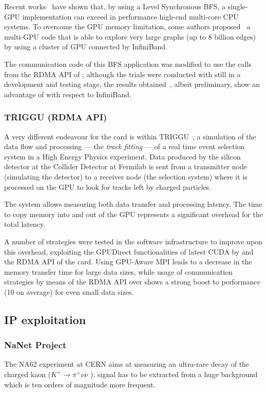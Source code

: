 Recent works~\cite{Hong:2011:BFS} have shown that, by using a Level
Synchronous BFS, a single-GPU implementation can exceed in performance
high-end multi-core CPU systems.
To overcome the GPU memory limitation, some authors
proposed~\cite{Graph400:2012:BFS} a multi-GPU code that is able to
explore very large graphs (up to 8 billion edges) by using a cluster
of GPU connected by InfiniBand.

The communication code of this BFS application was modified to use the
\PtoP calls from the RDMA API of \apenetp; although the trials were
conducted with \apenetp still in a development and testing stage, the
results obtained~\cite{Graph400:2012:IA3,CASS2013}, albeit
preliminary, show an advantage of \apenetp with respect to InfiniBand.

\subsubsection{TRIGGU (RDMA API)}
A very different endeavour for the \apenetp card is within
TRIGGU~\cite{TRIGGU:2012:NSS}, a simulation of the data flow and
processing --- the \emph{track fitting} --- of a real time event
selection system in a High Energy Physics experiment.
Data produced by the silicon detector at the Collider Detector at
Fermilab is sent from a transmitter node (simulating the detector) to
a receiver node (the selection system) where it is processed on the
GPU to look for tracks left by charged particles.

The system allows measuring both data transfer and processing latency.
The time to copy memory into and out of the GPU represents a
significant overhead for the total latency.

A number of strategies were tested in the software infrastructure to
improve upon this overhead, exploiting the GPUDirect functionalities
of latest CUDA by \nvidia and the RDMA API of the \apenetp card.
Using GPU-Aware MPI leads to a decrease in the memory transfer time
for large data sizes, while usage of \PtoP communication strategies by
means of the RDMA API over \apenetp shows a strong boost to
performance (10 \us on average) for even small data sizes.

\subsection{IP exploitation}
\subsubsection{NaNet Project}
The NA62 experiment at CERN aims at measuring an ultra-rare decay of
the charged kaon ($K^{+} \rightarrow \pi^{+} \nu\overline{\nu}$ );
signal has to be extracted from a huge background which is ten orders
of magnitude more frequent.

